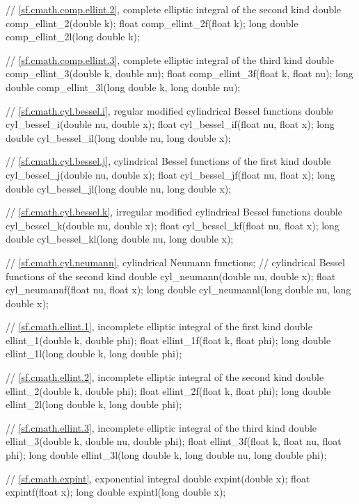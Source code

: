\begin{codeblock}
{  // \ref{sf.cmath.comp.ellint.2}, complete elliptic integral of the second kind
  double       comp_ellint_2(double k);
  float        comp_ellint_2f(float k);
  long double  comp_ellint_2l(long double k);

  // \ref{sf.cmath.comp.ellint.3}, complete elliptic integral of the third kind
  double       comp_ellint_3(double k, double nu);
  float        comp_ellint_3f(float k, float nu);
  long double  comp_ellint_3l(long double k, long double nu);

  // \ref{sf.cmath.cyl.bessel.i}, regular modified cylindrical Bessel functions
  double       cyl_bessel_i(double nu, double x);
  float        cyl_bessel_if(float nu, float x);
  long double  cyl_bessel_il(long double nu, long double x);

  // \ref{sf.cmath.cyl.bessel.j}, cylindrical Bessel functions of the first kind
  double       cyl_bessel_j(double nu, double x);
  float        cyl_bessel_jf(float nu, float x);
  long double  cyl_bessel_jl(long double nu, long double x);

  // \ref{sf.cmath.cyl.bessel.k}, irregular modified cylindrical Bessel functions
  double       cyl_bessel_k(double nu, double x);
  float        cyl_bessel_kf(float nu, float x);
  long double  cyl_bessel_kl(long double nu, long double x);

  // \ref{sf.cmath.cyl.neumann}, cylindrical Neumann functions;
  // cylindrical Bessel functions of the second kind
  double       cyl_neumann(double nu, double x);
  float        cyl_neumannf(float nu, float x);
  long double  cyl_neumannl(long double nu, long double x);

  // \ref{sf.cmath.ellint.1}, incomplete elliptic integral of the first kind
  double       ellint_1(double k, double phi);
  float        ellint_1f(float k, float phi);
  long double  ellint_1l(long double k, long double phi);

  // \ref{sf.cmath.ellint.2}, incomplete elliptic integral of the second kind
  double       ellint_2(double k, double phi);
  float        ellint_2f(float k, float phi);
  long double  ellint_2l(long double k, long double phi);

  // \ref{sf.cmath.ellint.3}, incomplete elliptic integral of the third kind
  double       ellint_3(double k, double nu, double phi);
  float        ellint_3f(float k, float nu, float phi);
  long double  ellint_3l(long double k, long double nu, long double phi);

  // \ref{sf.cmath.expint}, exponential integral
  double       expint(double x);
  float        expintf(float x);
  long double  expintl(long double x);

}
\end{codeblock}
